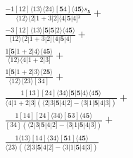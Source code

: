 \documentclass[varwidth, border=5pt]{standalone}
\begin{document}
\begin{my}
$\begin{gathered}
\scriptscriptstyle\frac{-1[12]⟨13⟩⟨24⟩[𝟓4]⟨4𝟓⟩s_{𝟓}}{⟨12⟩⟨2|1+3|2]⟨4|𝟓|4]²} +\\
\scriptscriptstyle\frac{-3[12]⟨13⟩[𝟓|𝟓|2⟩⟨4𝟓⟩}{⟨12⟩⟨2|1+3|2]⟨4|𝟓|4]} +\\
\scriptscriptstyle\frac{1[𝟓|1+2|4⟩⟨4𝟓⟩}{⟨12⟩⟨4|1+2|3]} +\\
\scriptscriptstyle\frac{1[𝟓|1+2|3⟩⟨2𝟓⟩}{⟨12⟩⟨23⟩[34]} +\\
\scriptscriptstyle\frac{1[13][24]⟨34⟩[𝟓|𝟓|4⟩⟨4𝟓⟩}{⟨4|1+2|3](⟨2|3|𝟓|4|2]-⟨3|1|𝟓|4|3])} +\\
\scriptscriptstyle\frac{1[14][24]⟨34⟩[𝟓3]⟨4𝟓⟩}{[34](⟨2|3|𝟓|4|2]-⟨3|1|𝟓|4|3])} +\\
\scriptscriptstyle\frac{1⟨13⟩[14]⟨34⟩[𝟓1]⟨4𝟓⟩}{⟨23⟩(⟨2|3|𝟓|4|2]-⟨3|1|𝟓|4|3])} \phantom{+}
\end{gathered}$
\end{my}
\end{document}
